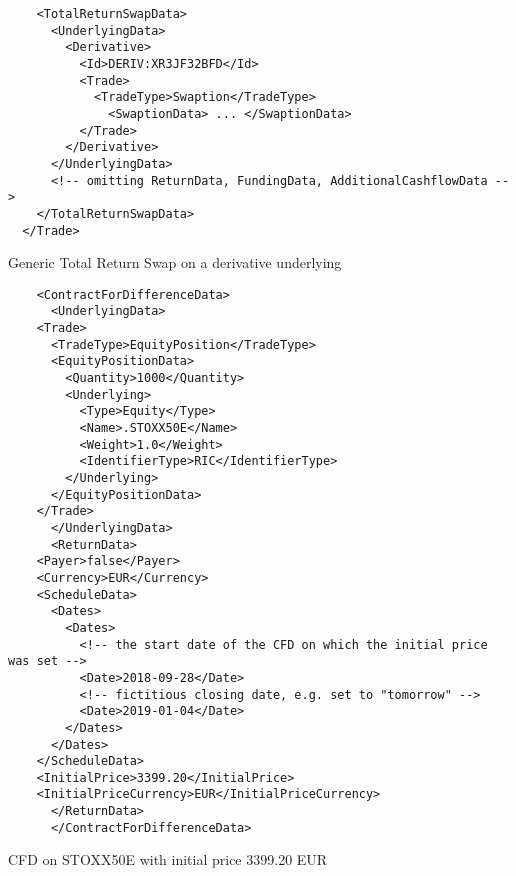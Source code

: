 \begin{listing}[H]
\begin{verbatim}
    <TotalReturnSwapData>
      <UnderlyingData>
        <Derivative>
          <Id>DERIV:XR3JF32BFD</Id>
          <Trade>
            <TradeType>Swaption</TradeType>
              <SwaptionData> ... </SwaptionData>
          </Trade>
        </Derivative>
      </UnderlyingData>
      <!-- omitting ReturnData, FundingData, AdditionalCashflowData -->
    </TotalReturnSwapData>
  </Trade>
\end{verbatim}
\caption{Generic Total Return Swap on a derivative underlying}
\label{lst:trsdata4}
\end{listing}

\begin{listing}[H]
\begin{verbatim}
    <ContractForDifferenceData>
      <UnderlyingData>
	<Trade>
	  <TradeType>EquityPosition</TradeType>
	  <EquityPositionData>
	    <Quantity>1000</Quantity>
	    <Underlying>
	      <Type>Equity</Type>
	      <Name>.STOXX50E</Name>
	      <Weight>1.0</Weight>
	      <IdentifierType>RIC</IdentifierType>
	    </Underlying>
	  </EquityPositionData>
	</Trade>
      </UnderlyingData>
      <ReturnData>
	<Payer>false</Payer>
	<Currency>EUR</Currency>
	<ScheduleData>
	  <Dates>
	    <Dates>
	      <!-- the start date of the CFD on which the initial price was set -->
	      <Date>2018-09-28</Date>
	      <!-- fictitious closing date, e.g. set to "tomorrow" -->
	      <Date>2019-01-04</Date>
	    </Dates>
	  </Dates>
	</ScheduleData>
	<InitialPrice>3399.20</InitialPrice>
	<InitialPriceCurrency>EUR</InitialPriceCurrency>
      </ReturnData>
      </ContractForDifferenceData>
\end{verbatim}
\caption{CFD on STOXX50E with initial price 3399.20 EUR}
\label{lst:trsdata_cfd}
\end{listing}
